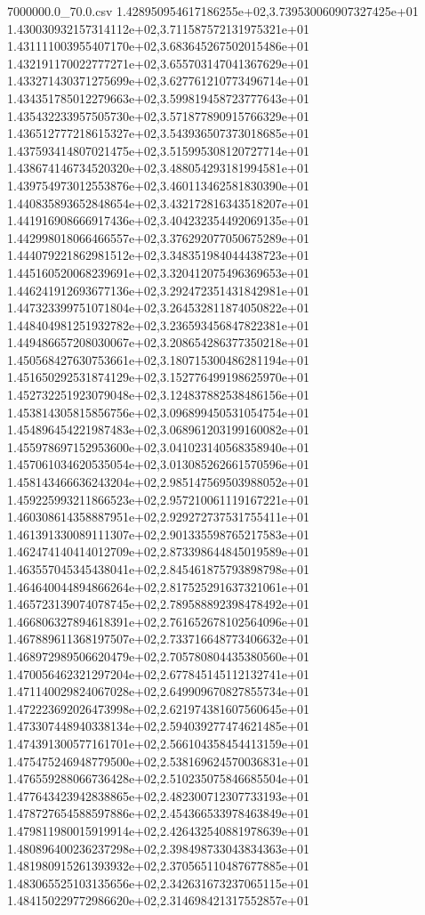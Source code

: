 \begin{filecontents*}{7000000.0_70.0.csv}
1.428950954617186255e+02,3.739530060907327425e+01
1.430030932157314112e+02,3.711587572131975321e+01
1.431111003955407170e+02,3.683645267502015486e+01
1.432191170022777271e+02,3.655703147041367629e+01
1.433271430371275699e+02,3.627761210773496714e+01
1.434351785012279663e+02,3.599819458723777643e+01
1.435432233957505730e+02,3.571877890915766329e+01
1.436512777218615327e+02,3.543936507373018685e+01
1.437593414807021475e+02,3.515995308120727714e+01
1.438674146734520320e+02,3.488054293181994581e+01
1.439754973012553876e+02,3.460113462581830390e+01
1.440835893652848654e+02,3.432172816343518207e+01
1.441916908666917436e+02,3.404232354492069135e+01
1.442998018066466557e+02,3.376292077050675289e+01
1.444079221862981512e+02,3.348351984044438723e+01
1.445160520068239691e+02,3.320412075496369653e+01
1.446241912693677136e+02,3.292472351431842981e+01
1.447323399751071804e+02,3.264532811874050822e+01
1.448404981251932782e+02,3.236593456847822381e+01
1.449486657208030067e+02,3.208654286377350218e+01
1.450568427630753661e+02,3.180715300486281194e+01
1.451650292531874129e+02,3.152776499198625970e+01
1.452732251923079048e+02,3.124837882538486156e+01
1.453814305815856756e+02,3.096899450531054754e+01
1.454896454221987483e+02,3.068961203199160082e+01
1.455978697152953600e+02,3.041023140568358940e+01
1.457061034620535054e+02,3.013085262661570596e+01
1.458143466636243204e+02,2.985147569503988052e+01
1.459225993211866523e+02,2.957210061119167221e+01
1.460308614358887951e+02,2.929272737531755411e+01
1.461391330089111307e+02,2.901335598765217583e+01
1.462474140414012709e+02,2.873398644845019589e+01
1.463557045345438041e+02,2.845461875793898798e+01
1.464640044894866264e+02,2.817525291637321061e+01
1.465723139074078745e+02,2.789588892398478492e+01
1.466806327894618391e+02,2.761652678102564096e+01
1.467889611368197507e+02,2.733716648773406632e+01
1.468972989506620479e+02,2.705780804435380560e+01
1.470056462321297204e+02,2.677845145112132741e+01
1.471140029824067028e+02,2.649909670827855734e+01
1.472223692026473998e+02,2.621974381607560645e+01
1.473307448940338134e+02,2.594039277474621485e+01
1.474391300577161701e+02,2.566104358454413159e+01
1.475475246948779500e+02,2.538169624570036831e+01
1.476559288066736428e+02,2.510235075846685504e+01
1.477643423942838865e+02,2.482300712307733193e+01
1.478727654588597886e+02,2.454366533978463849e+01
1.479811980015919914e+02,2.426432540881978639e+01
1.480896400236237298e+02,2.398498733043834363e+01
1.481980915261393932e+02,2.370565110487677885e+01
1.483065525103135656e+02,2.342631673237065115e+01
1.484150229772986620e+02,2.314698421317552857e+01

\end{filecontents*}
